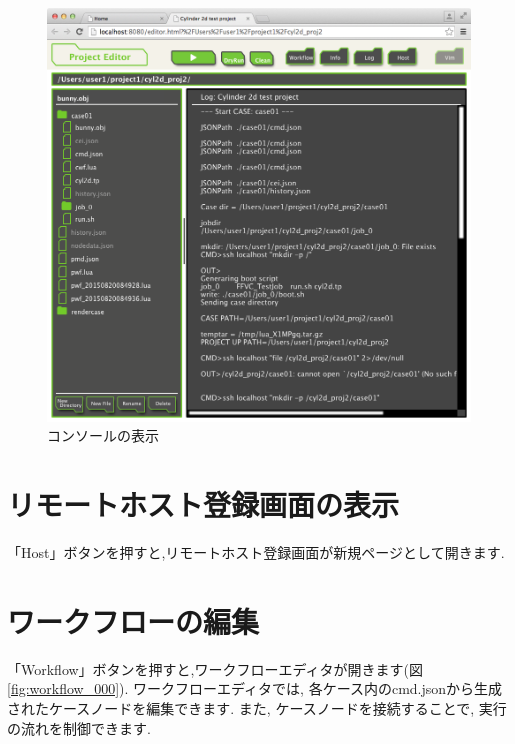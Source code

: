 \documentclass[a4paper,10pt,oneside]{jsbook}
\begin{document}
\begin{figure}[H]
	\begin{center}
		\includegraphics[width=12.0cm]{image/projeditor_004.png}
	\end{center}
	\caption{コンソールの表示}
	\label{fig:projeditor_comsole}
\end{figure}

\section{リモートホスト登録画面の表示}
「Host」ボタンを押すと,リモートホスト登録画面が新規ページとして開きます.

\section{ワークフローの編集}
「Workflow」ボタンを押すと,ワークフローエディタが開きます(図\ref{fig:workflow_000}).
ワークフローエディタでは, 各ケース内のcmd.jsonから生成されたケースノードを編集できます.
また, ケースノードを接続することで, 実行の流れを制御できます.
\end{document}
